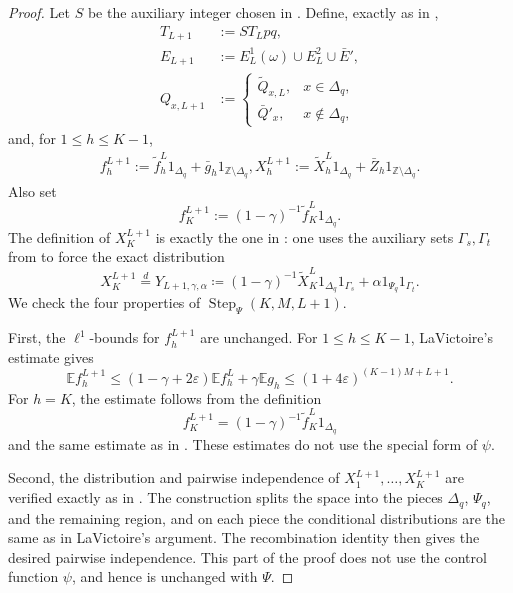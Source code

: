 \documentclass[12pt,leqno]{amsart}
\numberwithin{equation}{section}
\numberwithin{counter2}{section}
\theoremstyle{definition}
\theoremstyle{plain}
\begin{document}
\begin{proof}
	Let \(S\) be the auxiliary integer chosen in \cite[Section~8]{L9}. Define,
exactly as in \cite[(8.1)--(8.5)]{L9},
\begin{align}
    T_{L+1}&:=ST_Lpq,\\
	E_{L+1}&:=E_L^1(\omega)\cup E_L^2\cup \bar E',\\
	Q_{x,L+1}
	&:=
	\begin{cases}
		\widetilde Q_{x,L},& x\in\Delta_q,\\
		\bar Q'_x,& x\notin\Delta_q,
	\end{cases}
\end{align}
	and, for \(1\leq h\leq K-1\),
	\begin{align}\label{e:L+1def}
	    f_h^{L+1}
	:=
	\widetilde f_h^L1_{\Delta_q}
	+
	\bar g_h1_{\mathbb Z\setminus\Delta_q},
	X_h^{L+1}
	:=
	\widetilde X_h^L1_{\Delta_q}
	+
	\bar Z_h1_{\mathbb Z\setminus\Delta_q}.
	\end{align}
	Also set
	\[
	f_K^{L+1}:=(1-\gamma)^{-1}\widetilde f_K^L1_{\Delta_q}.
	\]
	The definition of \(X_K^{L+1}\) is exactly the one in \cite[Section~8]{L9}: one
	uses the auxiliary sets \(\Gamma_s,\Gamma_t\) from \cite[(8.6)]{L9} to force the
	exact distribution
	\[
	X_K^{L+1}\stackrel{d}{=}Y_{L+1,\gamma,\alpha}\coloneq 
(1-\gamma)^{-1}\widetilde X_K^L1_{\Delta_q}1_{\Gamma_s}
+\alpha1_{\Psi_q}1_{\Gamma_t}.
	\]
	We check the four properties of \(\operatorname{Step}_{\Psi}(K,M,L+1)\).

\medskip
    
	First, the \(\ell^1\)-bounds for \(f_h^{L+1}\) are unchanged. For
	\(1\leq h\leq K-1\), LaVictoire's estimate gives
	\[
	\mathbb E f_h^{L+1}
	\leq
	(1-\gamma+2\varepsilon)\mathbb E f_h^L
	+
	\gamma\mathbb E g_h
	\leq
	(1+4\varepsilon)^{(K-1)M+L+1}.
	\]
	For \(h=K\), the estimate follows from the definition
	\[
	f_K^{L+1}=(1-\gamma)^{-1}\widetilde f_K^L1_{\Delta_q}
	\]
	and the same estimate as in \cite[Section~8, verification of property~(1)]{L9}.
	These estimates do not use the special form of \(\psi\).

\bigskip
    
	Second, the distribution and pairwise independence of
\(X_1^{L+1},\dots,X_K^{L+1}\) are verified exactly as in
\cite[Section~8, verification of property~(2)]{L9}. The construction splits the
space into the pieces \(\Delta_q\), \(\Psi_q\), and the remaining region, and on
each piece the conditional distributions are the same as in LaVictoire's
argument. The recombination identity \cite[(8.7)]{L9} then gives the desired
pairwise independence. This part of the proof does not use the control function
\(\psi\), and hence is unchanged with \(\Psi\).


\end{proof}
\end{document}
